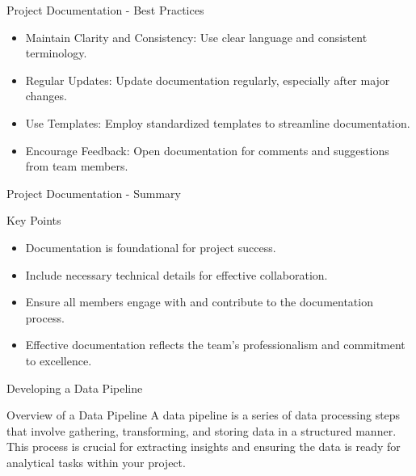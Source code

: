 \documentclass[aspectratio=169]{beamer}
\begin{document}
\begin{frame}[fragile]{Project Documentation - Best Practices}
    \begin{itemize}
        \item Maintain Clarity and Consistency: Use clear language and consistent terminology.
        \item Regular Updates: Update documentation regularly, especially after major changes.
        \item Use Templates: Employ standardized templates to streamline documentation.
        \item Encourage Feedback: Open documentation for comments and suggestions from team members.
    \end{itemize}
\end{frame}

\begin{frame}[fragile]{Project Documentation - Summary}
    \begin{block}{Key Points}
        \begin{itemize}
            \item Documentation is foundational for project success.
            \item Include necessary technical details for effective collaboration.
            \item Ensure all members engage with and contribute to the documentation process.
            \item Effective documentation reflects the team's professionalism and commitment to excellence.
        \end{itemize}
    \end{block}
\end{frame}

\begin{frame}{Developing a Data Pipeline}
    \begin{block}{Overview of a Data Pipeline}
        A data pipeline is a series of data processing steps that involve gathering, transforming, and storing data in a structured manner. This process is crucial for extracting insights and ensuring the data is ready for analytical tasks within your project.
    \end{block}
\end{frame}
\end{document}
